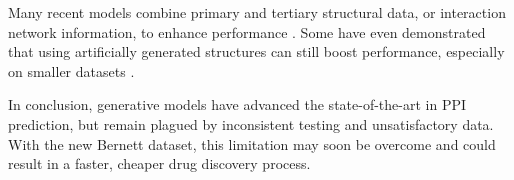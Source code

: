 \documentclass{article}
\begin{document}
Many recent models combine primary and tertiary structural data, or interaction network information, to enhance performance \citep{hu_spatialppiv2_2025, jiang_graph_2025, wu_mape-ppi_2024, kiouri_structure-based_gut_2025}. Some have even demonstrated that using artificially generated structures can still boost performance, especially on smaller datasets \citep{wu_mape-ppi_2024, jiang_graph_2025}.

In conclusion, generative models have advanced the state-of-the-art in PPI prediction, but remain plagued by inconsistent testing and unsatisfactory data. With the new Bernett dataset, this limitation may soon be overcome and could result in a faster, cheaper drug discovery process. 


\end{document}
